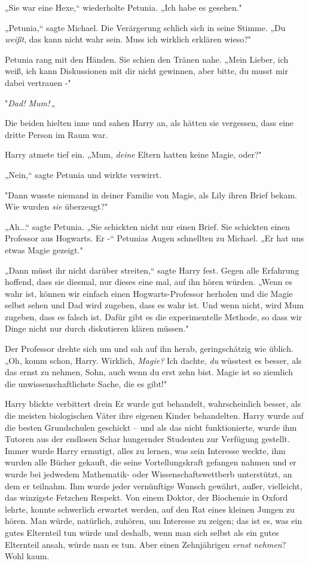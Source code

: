 {„Sie war eine Hexe,“ wiederholte Petunia. „Ich habe es gesehen."

„Petunia,“ sagte Michael. Die Verärgerung schlich sich in seine Stimme. „Du \emph{weißt}, das kann nicht wahr sein. Muss ich wirklich erklären wieso?"

Petunia rang mit den Händen. Sie schien den Tränen nahe. „Mein Lieber, ich weiß, ich kann Diskussionen mit dir nicht gewinnen, aber bitte, du musst mir dabei vertrauen -"

"\emph{Dad! Mum!}\,„

Die beiden hielten inne und sahen Harry an, als hätten sie vergessen, dass eine dritte Person im Raum war.

Harry atmete tief ein. „Mum, \emph{deine} Eltern hatten keine Magie, oder?"

„Nein,“ sagte Petunia und wirkte verwirrt.

"Dann wusste niemand in deiner Familie von Magie, als Lily ihren Brief bekam. Wie wurden \emph{sie} überzeugt?"

„Ah...“ sagte Petunia. „Sie schickten nicht nur einen Brief. Sie schickten einen Professor aus Hogwarts. Er -“ Petunias Augen schnellten zu Michael. „Er hat uns etwas Magie gezeigt."

„Dann müsst ihr nicht darüber streiten,“ sagte Harry fest. Gegen alle Erfahrung hoffend, dass sie diesmal, nur dieses eine mal, auf ihn hören würden. „Wenn es wahr ist, können wir einfach einen Hogwarts-Professor herholen und die Magie selbst sehen und Dad wird zugeben, dass es wahr ist. Und wenn nicht, wird Mum zugeben, dass es falsch ist. Dafür gibt es die experimentelle Methode, so dass wir Dinge nicht nur durch diskutieren klären müssen."

Der Professor drehte sich um und sah auf ihn herab, geringschätzig wie üblich. „Oh, komm schon, Harry. Wirklich, \emph{Magie?} Ich dachte, \emph{du} wüsstest es besser, als das ernst zu nehmen, Sohn, auch wenn du erst zehn bist. Magie ist so ziemlich die unwissenschaftlichste Sache, die es gibt!"

Harry blickte verbittert drein Er wurde gut behandelt, wahrscheinlich besser, als die meisten biologischen Väter ihre eigenen Kinder behandelten. Harry wurde auf die besten Grundschulen geschickt -- und als das nicht funktionierte, wurde ihm Tutoren aus der endlosen Schar hungernder Studenten zur Verfügung gestellt. Immer wurde Harry ermutigt, alles zu lernen, was sein Interesse weckte, ihm wurden alle Bücher gekauft, die seine Vortellungskraft gefangen nahmen und er wurde bei jedwedem Mathematik- oder Wissenschaftswettberb unterstützt, an dem er teilnahm. Ihm wurde jeder vernünftige Wunsch gewährt, außer, vielleicht, das winzigste Fetzchen Respekt. Von einem Doktor, der Biochemie in Oxford lehrte, konnte schwerlich erwartet werden, auf den Rat eines kleinen Jungen zu hören. Man würde, natürlich, zuhören, um Interesse zu zeigen; das ist es, was ein gutes Elternteil tun würde und deshalb, wenn man sich selbst als ein gutes Elternteil ansah, würde man es tun. Aber einen Zehnjährigen \emph{ernst nehmen}? Wohl kaum.

}
